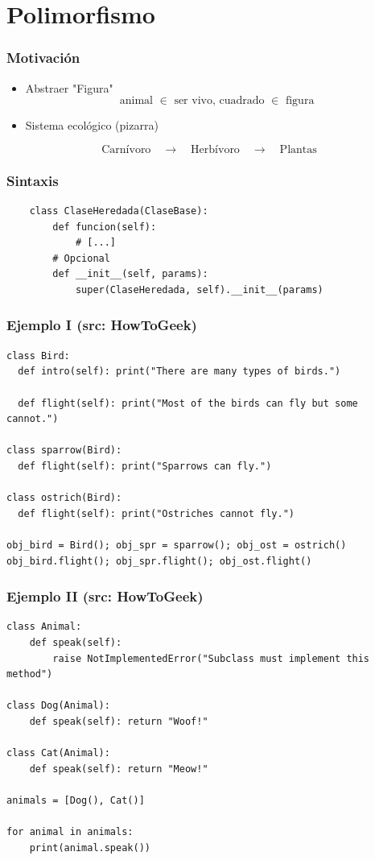 \documentclass[14pt,aspectratio=169,xcolor=dvipsnames]{beamer}
\begin{document}
\section{Polimorfismo}
\begin{frame}\frametitle{Motivación}
    \begin{itemize}
        \item Abstraer "Figura"
    \[ \text{animal $\in$ ser vivo, cuadrado $\in$ figura }\]
        \item Sistema ecológico (pizarra)
    \end{itemize}
    $$ \text{Carnívoro}\quad\to\quad\text{Herbívoro}\quad\to\quad\text{Plantas} $$
\end{frame}
\begin{frame}[fragile]\frametitle{Sintaxis}
    \begin{verbatim}
    class ClaseHeredada(ClaseBase):
        def funcion(self):
            # [...]
        # Opcional
        def __init__(self, params):
            super(ClaseHeredada, self).__init__(params)
    \end{verbatim}
\end{frame}
\begin{frame}[fragile]\frametitle{Ejemplo I (src: HowToGeek)}
    \begin{footnotesize}
    \begin{verbatim}
class Bird:
  def intro(self): print("There are many types of birds.")
    
  def flight(self): print("Most of the birds can fly but some cannot.")
  
class sparrow(Bird):
  def flight(self): print("Sparrows can fly.")
    
class ostrich(Bird):
  def flight(self): print("Ostriches cannot fly.")
    
obj_bird = Bird(); obj_spr = sparrow(); obj_ost = ostrich()
obj_bird.flight(); obj_spr.flight(); obj_ost.flight()
    \end{verbatim}
    \end{footnotesize}
\end{frame}
\begin{frame}[fragile]\frametitle{Ejemplo II (src: HowToGeek)}
    \begin{footnotesize}
    \begin{verbatim}
class Animal:
    def speak(self):
        raise NotImplementedError("Subclass must implement this method")

class Dog(Animal):
    def speak(self): return "Woof!"

class Cat(Animal):
    def speak(self): return "Meow!"

animals = [Dog(), Cat()]

for animal in animals:
    print(animal.speak())
    \end{verbatim}
    \end{footnotesize}
\end{frame}
\end{document}
